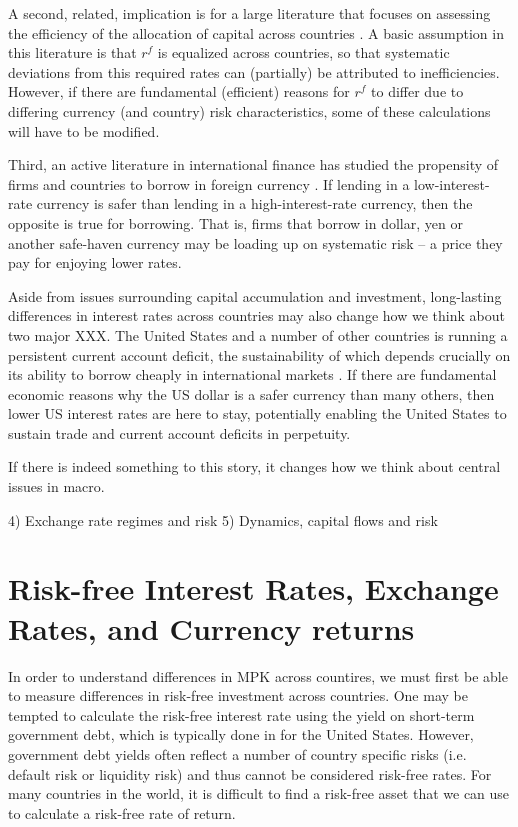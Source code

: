 \documentclass[12pt,letter]{article}
\theoremstyle{break} \theorembodyfont{\normalfont\itshape}
\theoremstyle{break}
\theoremstyle{break} \theorembodyfont{\normalfont\itshape}
\theoremstyle{break} \theorembodyfont{\normalfont\itshape}
\begin{document}
A second, related, implication is for a large literature that focuses on assessing the efficiency of the allocation of capital across countries \citep{HallJones1997, CaselliFeyrer2007}. A basic assumption in this literature is that $r^f$ is equalized across countries, so that systematic deviations from this required rates can (partially) be attributed to inefficiencies. However, if there are fundamental (efficient) reasons for $r^f$ to differ due to differing currency (and country) risk characteristics, some of these calculations will have to be modified.

Third, an active literature in international finance has studied the propensity of firms and countries to borrow in foreign currency \citep{DuSchreger2016, KalemliOzcanetal2019}. If lending in a low-interest-rate currency is safer than lending in a high-interest-rate currency, then the opposite is true for borrowing. That is, firms that borrow in dollar, yen or another safe-haven currency may be loading up on systematic risk -- a price they pay for enjoying lower rates.

Aside from issues surrounding capital accumulation and investment, long-lasting differences in interest rates across countries may also change how we think about two major XXX. The United States and a number of other countries is running a persistent current account deficit, the sustainability of which depends crucially on its ability to borrow cheaply in international markets \citep{GourinchasRey2007}. If there are fundamental economic reasons why the US dollar is a safer currency than many others, then lower US interest rates are here to stay, potentially enabling the United States to sustain trade and current account deficits in perpetuity.

If there is indeed something to this story, it changes how we think
about central issues in macro.

 4) Exchange rate regimes and risk 5)
Dynamics, capital flows and risk


\section{Risk-free Interest Rates, Exchange Rates, and Currency
  returns}

In order to understand differences in MPK across countires, we must 
first be able to measure differences in risk-free investment across 
countries. One may be tempted to calculate the risk-free 
interest rate using the yield on short-term government debt, which is 
typically done in for the United States. However, government debt yields 
often reflect a number of country specific risks (i.e. default risk or
liquidity risk) and thus cannot be considered risk-free rates. For 
many countries in the world, it is difficult to find a risk-free asset 
that we can use to calculate a risk-free rate of return.
\end{document}
